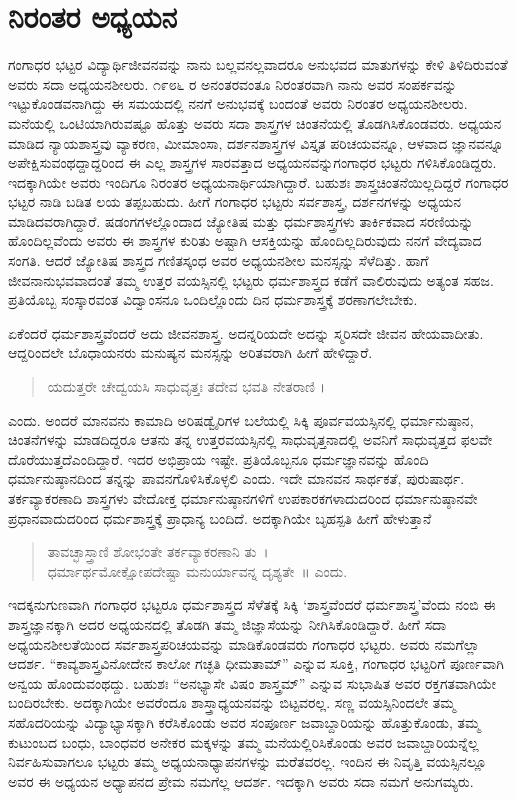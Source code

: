 {\section*{ನಿರಂತರ ಅಧ್ಯಯನ}

ಗಂಗಾಧರ ಭಟ್ಟರ ವಿದ್ಯಾರ್ಥಿಜೀವನವನ್ನು ನಾನು ಬಲ್ಲವನಲ್ಲವಾದರೂ ಅನುಭವದ ಮಾತುಗಳನ್ನು ಕೇಳಿ ತಿಳಿದಿರುವಂತೆ ಅವರು ಸದಾ ಅಧ್ಯಯನಶೀಲರು. ೧೯೮೬ ರ ಅನಂತರ\-ವಂತೂ ನಿರಂತರವಾಗಿ ನಾನು ಅವರ ಸಂಪರ್ಕವನ್ನು ಇಟ್ಟುಕೊಂಡವನಾಗಿದ್ದು ಈ ಸಮಯದಲ್ಲಿ ನನಗೆ ಅನುಭವಕ್ಕೆ ಬಂದಂತೆ ಅವರು ನಿರಂತರ ಅಧ್ಯಯನ\-ಶೀಲರು. ಮನೆಯಲ್ಲಿ ಒಂಟಿಯಾಗಿರುವಷ್ಟೂ ಹೊತ್ತು ಅವರು ಸದಾ ಶಾಸ್ತ್ರಗಳ ಚಿಂತನೆ\-ಯಲ್ಲಿ ತೊಡಗಿಸಿಕೊಂಡವರು. ಅಧ್ಯಯನ ಮಾಡಿದ ನ್ಯಾಯಶಾಸ್ತ್ರವು ವ್ಯಾಕರಣ, ಮೀಮಾಂಸಾ, ದರ್ಶನಶಾಸ್ತ್ರಗಳ ವಿಸ್ತೃತ ಪರಿಚಯವನ್ನೂ, ಆಳವಾದ ಜ್ಞಾನವನ್ನೂ ಅಪೇಕ್ಷಿಸುವಂಥದ್ದಾದ್ದರಿಂದ ಈ ಎಲ್ಲ ಶಾಸ್ತ್ರಗಳ ಸಾರವತ್ತಾದ ಅಧ್ಯಯನವನ್ನು\break ಗಂಗಾಧರ ಭಟ್ಟರು ಗಳಿಸಿಕೊಂಡಿದ್ದರು. ಇದಕ್ಕಾಗಿಯೇ ಅವರು ಇಂದಿಗೂ ನಿರಂತರ ಅಧ್ಯಯ\-ನಾರ್ಥಿಯಾಗಿದ್ದಾರೆ. ಬಹುಶಃ ಶಾಸ್ತ್ರಚಿಂತನೆಯಿಲ್ಲದಿದ್ದರೆ ಗಂಗಾಧರ ಭಟ್ಟರ ನಾಡಿ ಬಡಿತ ಲಯ ತಪ್ಪಬಹುದು. ಹೀಗೆ ಗಂಗಾಧರ ಭಟ್ಟರು ಸರ್ವಶಾಸ್ತ್ರ, ದರ್ಶನ\-ಗಳನ್ನು ಅಧ್ಯಯನ ಮಾಡಿದವರಾಗಿದ್ದಾರೆ. ಷಡಂಗಗಳಲ್ಲೊಂದಾದ ಜ್ಯೋತಿಷ ಮತ್ತು ಧರ್ಮಶಾಸ್ತ್ರಗಳು ತಾರ್ಕಿಕವಾದ ಸರಣಿಯನ್ನು ಹೊಂದಿಲ್ಲವೆಂದು ಅವರು ಈ ಶಾಸ್ತ್ರಗಳ ಕುರಿತು ಅಷ್ಟಾಗಿ ಆಸಕ್ತಿಯನ್ನು ಹೊಂದಿಲ್ಲದಿರುವುದು ನನಗೆ ವೇದ್ಯವಾದ ಸಂಗತಿ. ಆದರೆ ಜ್ಯೋತಿಷ ಶಾಸ್ತ್ರದ ಗಣಿತಸ್ಕಂಧ ಅವರ ಅಧ್ಯಯನಶೀಲ ಮನಸ್ಸನ್ನು ಸೆಳೆದಿತ್ತು. ಹಾಗೆ ಜೀವನಾನುಭವವಾದಂತೆ ತಮ್ಮ ಉತ್ತರ ವಯಸ್ಸಿನಲ್ಲಿ ಭಟ್ಟರು ಧರ್ಮಶಾಸ್ತ್ರದ ಕಡೆಗೆ ವಾಲಿರುವುದು ಅತ್ಯಂತ ಸಹಜ. ಪ್ರತಿಯೊಬ್ಬ ಸಂಸ್ಕಾರವಂತ ವಿದ್ವಾಂಸನೂ ಒಂದಿಲ್ಲೊಂದು ದಿನ ಧರ್ಮಶಾಸ್ತ್ರಕ್ಕೆ ಶರಣಾಗಲೇಬೇಕು.

ಏಕೆಂದರೆ ಧರ್ಮಶಾಸ್ತ್ರವೆಂದರೆ ಅದು ಜೀವನಶಾಸ್ತ್ರ. ಅದನ್ನರಿಯದೇ ಅದನ್ನು ಸ್ಮರಿಸದೇ ಜೀವನ ಹೇಯವಾದೀತು. ಆದ್ದರಿಂದಲೇ ಬೊಧಾಯನರು ಮನುಷ್ಯನ ಮನಸ್ಸನ್ನು ಅರಿತವರಾಗಿ ಹೀಗೆ ಹೇಳಿದ್ದಾರೆ.
\begin{verse}
ಯದುತ್ತರೇ ಚೇದ್ವಯಸಿ ಸಾಧುವೃತ್ತಃ ತದೇವ ಭವತಿ ನೇತರಾಣಿ ।
\end{verse}
 ಎಂದು. ಅಂದರೆ ಮಾನವನು ಕಾಮಾದಿ ಅರಿಷಡ್ವೈರಿಗಳ ಬಲೆಯಲ್ಲಿ ಸಿಕ್ಕಿ ಪೂರ್ವ\-ವಯಸ್ಸಿ\-ನಲ್ಲಿ ಧರ್ಮಾನುಷ್ಠಾನ, ಚಿಂತನೆಗಳನ್ನು ಮಾಡದಿದ್ದರೂ ಆತನು ತನ್ನ ಉತ್ತರ\-ವಯಸ್ಸಿನಲ್ಲಿ ಸಾಧುವೃತ್ತನಾದಲ್ಲಿ ಅವನಿಗೆ ಸಾಧುವೃತ್ತದ ಫಲವೇ ದೊರೆಯುತ್ತದೆ\break ಎಂದಿದ್ದಾರೆ. ಇದರ ಅಭಿಪ್ರಾಯ ಇಷ್ಟೇ. ಪ್ರತಿಯೊಬ್ಬನೂ ಧರ್ಮಜ್ಞಾನವನ್ನು ಹೊಂದಿ ಧರ್ಮಾನುಷ್ಠಾನದಿಂದ ತನ್ನನ್ನು ಪಾವನಗೊಳಿಸಿಕೊಳ್ಳಲಿ ಎಂದು. ಇದೇ ಮಾನವನ ಸಾರ್ಥಕತೆ, ಪುರುಷಾರ್ಥ. ತರ್ಕವ್ಯಾಕರಣಾದಿ ಶಾಸ್ತ್ರಗಳು ವೇದೋಕ್ತ ಧರ್ಮಾನುಷ್ಠಾನಗಳಿಗೆ ಉಪಕಾರಕಗಳಾದುದರಿಂದ ಧರ್ಮಾನುಷ್ಠಾನವೇ ಪ್ರಧಾನವಾದುದರಿಂದ ಧರ್ಮಶಾಸ್ತ್ರಕ್ಕೆ ಪ್ರಾಧಾನ್ಯ ಬಂದಿದೆ. ಅದಕ್ಕಾಗಿಯೇ ಬೃಹಸ್ಪತಿ ಹೀಗೆ ಹೇಳುತ್ತಾನೆ  \enginline{-}  
\begin{verse}
ತಾವಚ್ಛಾಸ್ತ್ರಾಣಿ ಶೋಭಂತೇ ತರ್ಕವ್ಯಾಕರಣಾನಿ ತು~।\\
ಧರ್ಮಾರ್ಥಮೋಕ್ಷೋಪದೇಷ್ಟಾ ಮನುರ್ಯಾವನ್ನ ದೃಶ್ಯತೇ~॥ ಎಂದು.
\end{verse}
ಇದಕ್ಕನುಗುಣವಾಗಿ ಗಂಗಾಧರ ಭಟ್ಟರೂ ಧರ್ಮಶಾಸ್ತ್ರದ ಸೆಳೆತಕ್ಕೆ ಸಿಕ್ಕಿ ‘ಶಾಸ್ತ್ರವೆಂದರೆ ಧರ್ಮಶಾಸ್ತ್ರ’ವೆಂದು ನಂಬಿ ಈ ಶಾಸ್ತ್ರಜ್ಞಾನಕ್ಕಾಗಿ ಅದರ ಅಧ್ಯಯನದಲ್ಲಿ ತೊಡಗಿ ತಮ್ಮ ಜಿಜ್ಞಾಸೆಯನ್ನು ನೀಗಿಸಿಕೊಂಡಿದ್ದಾರೆ. ಹೀಗೆ ಸದಾ ಅಧ್ಯಯನಶೀಲತೆಯಿಂದ ಸರ್ವಶಾಸ್ತ್ರಪರಿಚಯವನ್ನು ಮಾಡಿಕೊಂಡವರು ಗಂಗಾಧರ ಭಟ್ಟರು. ಅವರು ನಮಗೆಲ್ಲಾ ಆದರ್ಶ. “ಕಾವ್ಯಶಾಸ್ತ್ರವಿನೋದೇನ ಕಾಲೋ ಗಚ್ಛತಿ ಧೀಮತಾಮ್” ಎನ್ನುವ ಸೂಕ್ತಿ, ಗಂಗಾಧರ ಭಟ್ಟರಿಗೆ ಪೂರ್ಣವಾಗಿ ಅನ್ವಯ ಹೊಂದುವಂಥದ್ದು. ಬಹುಶಃ “ಅನಭ್ಯಾಸೇ ವಿಷಂ ಶಾಸ್ತ್ರಮ್” ಎನ್ನುವ ಸುಭಾಷಿತ ಅವರ ರಕ್ತಗತವಾಗಿಯೇ ಬಂದಿರಬೇಕು. ಅದಕ್ಕಾಗಿಯೇ ಅವರೆಂದೂ ಶಾಸ್ತ್ರಾಧ್ಯಯನವನ್ನು ಬಿಟ್ಟವರಲ್ಲ. ಸಣ್ಣ ವಯಸ್ಸಿನಿಂದಲೇ ತಮ್ಮ ಸಹೊದರಿಯನ್ನು ವಿದ್ಯಾಭ್ಯಾಸಕ್ಕಾಗಿ ಕರೆಸಿಕೊಂಡು ಅವರ ಸಂಪೂರ್ಣ ಜವಾಬ್ದಾರಿಯನ್ನು ಹೊತ್ತುಕೊಂಡು, ತಮ್ಮ ಕುಟುಂಬದ ಬಂಧು, ಬಾಂಧವರ ಅನೇಕರ ಮಕ್ಕಳನ್ನು ತಮ್ಮ ಮನೆಯಲ್ಲಿರಿಸಿಕೊಂಡು ಅವರ ಜವಾಬ್ದಾರಿಯನ್ನೆಲ್ಲ ನಿರ್ವಹಿಸುವಾಗಲೂ ಭಟ್ಟರು ತಮ್ಮ ಅಧ್ಯಯನಾಧ್ಯಾಪನಗಳನ್ನು ಮರೆತವರಲ್ಲ. ಇಂದಿನ ಈ ನಿವೃತ್ತಿ ವಯಸ್ಸಿ\-ನಲ್ಲೂ ಅವರ ಈ ಅಧ್ಯಯನ ಅಧ್ಯಾಪನದ ಪ್ರೇಮ ನಮಗೆಲ್ಲ ಆದರ್ಶ. ಇದಕ್ಕಾಗಿ ಅವರು ಸದಾ ನಮಗೆ ಅನುಗಮ್ಯರು.

}
